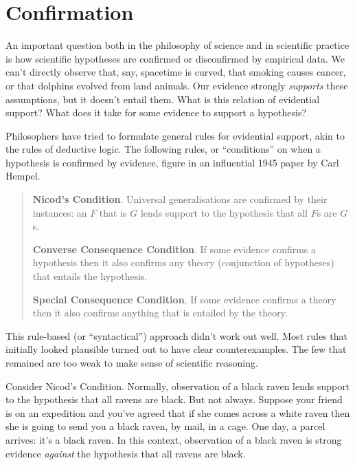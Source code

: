 \section{Confirmation}%
\label{sec:bct}

An important question both in the philosophy of science and in scientific
practice is how scientific hypotheses are confirmed or disconfirmed by empirical
data. We can't directly observe that, say, spacetime is curved, that smoking
causes cancer, or that dolphins evolved from land animals. Our evidence strongly
\emph{supports} these assumptions, but it doesn't entail them. What is this
relation of evidential support? What does it take for some evidence to support a
hypothesis?

Philosophers have tried to formulate general rules for evidential support, akin
to the rules of deductive logic. The following rules, or ``conditions'' on when a
hypothesis is confirmed by evidence, figure in an influential 1945
paper by Carl Hempel.

\begin{quote}
  \textbf{Nicod's Condition}. Universal generalisations are confirmed by their
  instances: an $F$ that is $G$ lends support to the hypothesis that all $F$s
  are $G$s.

  \textbf{Converse Consequence Condition}. If some evidence confirms a
  hypothesis then it also confirms any theory (conjunction of hypotheses) that
  entails the hypothesis.
  
  \textbf{Special Consequence Condition}. If some evidence confirms a theory
  then it also confirms anything that is entailed by the theory.
\end{quote}    

This rule-based (or ``syntactical'') approach didn't work out well. Most rules
that initially looked plausible turned out to have clear counterexamples. The
few that remained are too weak to make sense of scientific reasoning.

Consider Nicod's Condition. Normally, observation of a black raven lends
support to the hypothesis that all ravens are black. But not always. Suppose
your friend is on an expedition and you've agreed that if she comes across a
white raven then she is going to send you a black raven, by mail, in a cage. One
day, a parcel arrives: it's a black raven. In this context, observation of a
black raven is strong evidence \emph{against} the hypothesis that all ravens are
black.


